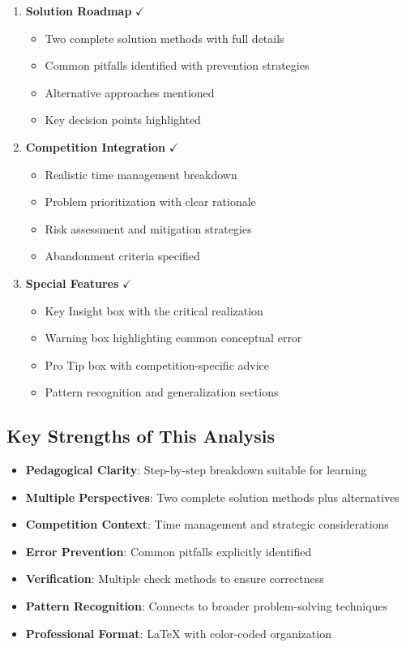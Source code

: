 \documentclass[12pt]{article}
\begin{document}
\begin{enumerate}
    \item \textbf{Solution Roadmap} $\checkmark$
    \begin{itemize}
        \item Two complete solution methods with full details
        \item Common pitfalls identified with prevention strategies
        \item Alternative approaches mentioned
        \item Key decision points highlighted
    \end{itemize}
    
    \item \textbf{Competition Integration} $\checkmark$
    \begin{itemize}
        \item Realistic time management breakdown
        \item Problem prioritization with clear rationale
        \item Risk assessment and mitigation strategies
        \item Abandonment criteria specified
    \end{itemize}
    
    \item \textbf{Special Features} $\checkmark$
    \begin{itemize}
        \item Key Insight box with the critical realization
        \item Warning box highlighting common conceptual error
        \item Pro Tip box with competition-specific advice
        \item Pattern recognition and generalization sections
    \end{itemize}
\end{enumerate}

\subsection*{Key Strengths of This Analysis}

\begin{itemize}[leftmargin=*]
    \item \textbf{Pedagogical Clarity}: Step-by-step breakdown suitable for learning
    \item \textbf{Multiple Perspectives}: Two complete solution methods plus alternatives
    \item \textbf{Competition Context}: Time management and strategic considerations
    \item \textbf{Error Prevention}: Common pitfalls explicitly identified
    \item \textbf{Verification}: Multiple check methods to ensure correctness
    \item \textbf{Pattern Recognition}: Connects to broader problem-solving techniques
    \item \textbf{Professional Format}: LaTeX with color-coded organization
\end{itemize}
\end{document}
